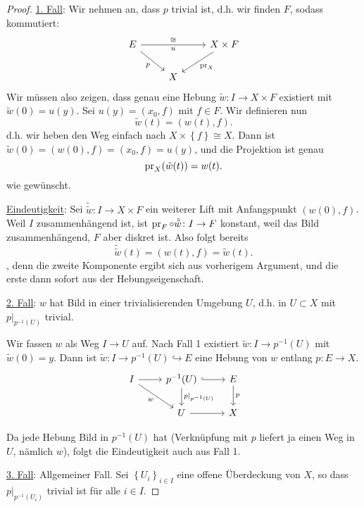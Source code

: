\begin{proof}
    \underline{1. Fall}: Wir nehmen an, dass $p$ trivial ist, d.h. wir finden $F$, sodass kommutiert:
    \[
    \begin{tikzcd}
        E \ar{rr}{\cong}[swap]{u} \ar[swap]{dr}{p} & & X\times F \ar{dl}{\pr_X} \\
    & X
    \end{tikzcd}
    \]
    Wir müssen also zeigen, dass genau eine Hebung $\tilde{w}\colon I \to  X\times F$ existiert mit $\tilde{w}(0) = u(y)$. Sei $u(y) = (x_0,f)$ mit $f\in F$. Wir definieren nun
    \[
        \tilde{w}(t) = (w(t),f)
    .\] 
    d.h. wir heben den Weg einfach nach $X\times \left \{f\right\} \cong X$. Dann ist $\tilde{w}(0) = (w(0),f) = (x_0,f) = u(y)$, und die Projektion ist genau
    \[
        \operatorname{pr}_X(\tilde{w}(t)) = w(t)
    .\] 
    wie gewünscht.

    \underline{Eindeutigkeit}:  Sei $\tilde{\tilde{w}}\colon I \to  X \times F$ ein weiterer Lift mit Anfangspunkt $(w(0),f)$. Weil  $I$ zusammenhängend ist, ist $\operatorname{pr}_F \circ  \tilde{\tilde{w}} \colon  I \to  F$ konstant, weil das Bild zusammenhängend, $F$ aber diskret ist. Also folgt bereits
     \[
         \tilde{\tilde{w}} (t) = (w(t),f) = \tilde{w}(t)
    .\] 
    , denn die zweite Komponente ergibt sich aus vorherigem Argument, und die erste dann sofort aus der Hebungseigenschaft.

    \underline{2. Fall}: $w$ hat Bild in einer trivialisierenden Umgebung  $U$, d.h. in  $U\subset X$ mit $p|_{p^{-1} (U)}$ trivial. 

    Wir fassen $w$ als Weg  $I \to  U$ auf. Nach Fall 1 existiert $\tilde{w}\colon  I \to  p^{-1} (U)$ mit $\tilde{w}(0) = y$. Dann ist $\tilde{w}\colon  I \to  p^{-1} (U) \hookrightarrow E$ eine Hebung von $w$ entlang  $p\colon  E \to  X$.
    \[
    \begin{tikzcd}
        I \ar{r} \ar[swap]{dr}{w} & p^{-1} (U) \ar{d}{p|_{p^{-1} (U)}} \ar[hook]{r} & E \ar{d}{p}\\
                                  & U \ar{r}& X
    \end{tikzcd}
\]

    Da jede Hebung Bild in $p^{-1} (U)$ hat (Verknüpfung mit $p$ liefert ja einen Weg in  $U$, nämlich  $w$), folgt die Eindeutigkeit auch aus Fall 1.

    \underline{3. Fall}: Allgemeiner Fall. Sei $\left \{U_i\right\} _{i \in I}$ eine offene Überdeckung von $X$, so dass  $p|_{p^{-1} (U_i)}$ trivial ist für alle $i\in I$.


\end{proof}
